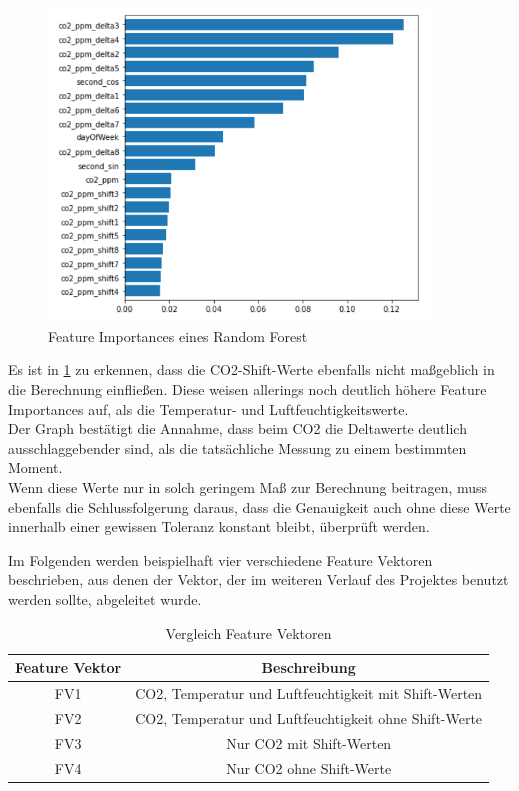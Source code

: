 \begin{figure}[h]
    \centering
    \includegraphics[width=0.9\textwidth]{pic/feature_importances_better.png}
    \caption{Feature Importances eines Random Forest}
    \label{fig:FIB}
\end{figure}

Es ist in \ref{fig:FIB} zu erkennen, dass die CO2-Shift-Werte ebenfalls nicht maßgeblich in die Berechnung einfließen. Diese weisen
allerings noch deutlich höhere Feature Importances auf, als die Temperatur- und Luftfeuchtigkeitswerte.\\
Der Graph bestätigt die Annahme, dass beim CO2 die Deltawerte deutlich ausschlaggebender sind, als die 
tatsächliche Messung zu einem bestimmten Moment. \\

\newpage
Wenn diese Werte nur in solch geringem Maß zur Berechnung beitragen, muss ebenfalls die Schlussfolgerung daraus, 
dass die Genauigkeit auch ohne diese Werte innerhalb einer gewissen Toleranz konstant bleibt, überprüft werden.

Im Folgenden werden beispielhaft vier verschiedene Feature Vektoren beschrieben, aus denen der Vektor, der im 
weiteren Verlauf des Projektes benutzt werden sollte, abgeleitet wurde.
\begin{center}
    \begin{table}[h]
        \centering
        \caption{Vergleich Feature Vektoren}
        \begin{tabular}{ |c||c| } 
        \hline
        Feature Vektor & Beschreibung \\ 
        \hline\hline
        FV1 & CO2, Temperatur und Luftfeuchtigkeit mit Shift-Werten\\ 
        FV2 & CO2, Temperatur und Luftfeuchtigkeit ohne Shift-Werte \\ 
        FV3 & Nur CO2 mit Shift-Werten\\ 
        FV4 & Nur CO2 ohne Shift-Werte \\
        \hline
        \end{tabular}
    \end{table}
\end{center}

